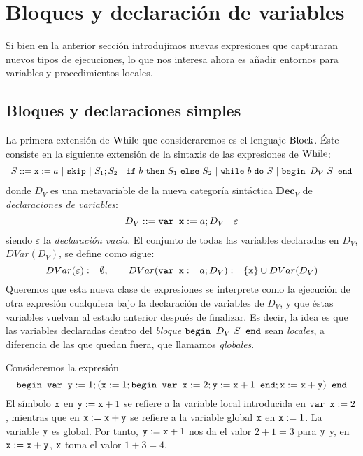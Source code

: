 \begin{example}
\end{example}


\section{Bloques y declaración de variables}


Si bien en la anterior sección introdujimos nuevas expresiones que capturaran nuevos tipos de ejecuciones, lo que nos interesa ahora es añadir entornos para variables y procedimientos locales. 

\subsection{Bloques y declaraciones simples}

La primera extensión de $\mathrm{While}$ que consideraremos es el lenguaje $\mathrm{Block}$. Éste consiste en la siguiente extensión de la sintaxis de las expresiones de $\mathrm{While}$:
\[
    \begin{array}{l}
         S ::= \n{x}:=a\ |\ \n{skip}\ |\ S_1;S_2\ |\ \n{if}\ b\ \n{then}\ S_1\ \n{else}\ S_2\ |\ \n{while}\ b\ \n{do}\ S \ | \ \n{begin } D_V \  S \n{ end}
    \end{array}
\]
donde $D_V$ es una metavariable de la nueva categoría sintáctica $\textbf{Dec}_V$ de \textit{declaraciones de variables}:
\[
    D_V ::= \texttt{var x} := a; D_V\ |\ \varepsilon
\]
siendo $\varepsilon$ la \textit{declaración vacía}. El conjunto de todas las variables declaradas en $D_V$, $DVar(D_V)$, se define como sigue:
$$DVar(\varepsilon):= \emptyset, \quad \quad DVar(\texttt{var x}:=a; D_V) := \{\texttt{x}\}\cup DVar(D_V)$$
Queremos que esta nueva clase de expresiones se interprete como la ejecución de otra expresión cualquiera bajo la declaración de variables de $D_V$, y que éstas variables vuelvan al estado anterior después de finalizar. Es decir, la idea es que las variables declaradas dentro del \textit{bloque} $\texttt{begin } D_V \  S \texttt{ end}$ sean \textit{locales}, a diferencia de las que quedan fuera, que llamamos \textit{globales}.

\begin{example}
Consideremos la expresión $$\texttt{begin var y} := 1; (\texttt{x}:=1; \texttt{begin var x}:= 2 ; \texttt{y}:=\texttt{x}+1 \texttt{ end}; \texttt{x}:=\texttt{x}+\texttt{y}) \texttt{ end}$$
El símbolo $\texttt{x}$ en $\texttt{y}:= \texttt{x}+1$ se refiere a la variable local introducida en $\texttt{var x}:=2$, mientras que en $\texttt{x}:= \texttt{x}+\texttt{y}$ se refiere a la variable global $\texttt{x}$ en $\texttt{x}:=1$. La variable $\texttt{y}$ es global. Por tanto, $\texttt{y}:=\texttt{x}+1$ nos da el valor $2 + 1 = 3$ para $\texttt{y}$ y, en $\texttt{x}:=\texttt{x}+\texttt{y}$, $\texttt{x}$ toma el valor $1 + 3 = 4$.
\end{example}

